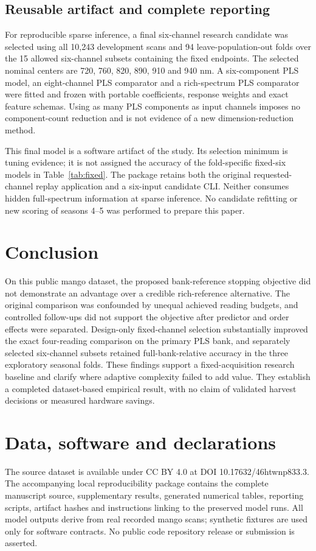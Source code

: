 \documentclass[11pt,a4paper]{article}
\begin{document}
\subsection{Reusable artifact and complete reporting}
For reproducible sparse inference, a final six-channel research candidate was selected using all 10,243 development scans and 94 leave-population-out folds over the 15 allowed six-channel subsets containing the fixed endpoints. The selected nominal centers are 720, 760, 820, 890, 910 and 940 nm. A six-component PLS model, an eight-channel PLS comparator and a rich-spectrum PLS comparator were fitted and frozen with portable coefficients, response weights and exact feature schemas. Using as many PLS components as input channels imposes no component-count reduction and is not evidence of a new dimension-reduction method.

This final model is a software artifact of the study. Its selection minimum is tuning evidence; it is not assigned the accuracy of the fold-specific fixed-six models in Table~\ref{tab:fixed}. The package retains both the original requested-channel replay application and a six-input candidate CLI. Neither consumes hidden full-spectrum information at sparse inference. No candidate refitting or new scoring of seasons 4--5 was performed to prepare this paper.

\section{Conclusion}
On this public mango dataset, the proposed bank-reference stopping objective did not demonstrate an advantage over a credible rich-reference alternative. The original comparison was confounded by unequal achieved reading budgets, and controlled follow-ups did not support the objective after predictor and order effects were separated. Design-only fixed-channel selection substantially improved the exact four-reading comparison on the primary PLS bank, and separately selected six-channel subsets retained full-bank-relative accuracy in the three exploratory seasonal folds. These findings support a fixed-acquisition research baseline and clarify where adaptive complexity failed to add value. They establish a completed dataset-based empirical result, with no claim of validated harvest decisions or measured hardware savings.

\section*{Data, software and declarations}
The source dataset is available under CC BY 4.0 at DOI 10.17632/46htwnp833.3. The accompanying local reproducibility package contains the complete manuscript source, supplementary results, generated numerical tables, reporting scripts, artifact hashes and instructions linking to the preserved model runs. All model outputs derive from real recorded mango scans; synthetic fixtures are used only for software contracts. No public code repository release or submission is asserted.
\end{document}
